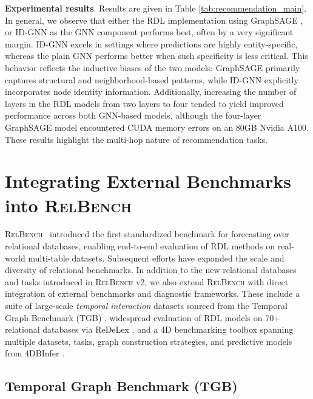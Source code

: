 \documentclass{article} %
\newcommand{\relbench}{\textsc{RelBench}\xspace}
\begin{document}
\textbf{Experimental results}. Results are given in Table \ref{tab:recommendation_main}. In general, we observe that either the RDL implementation using GraphSAGE \citep{hamilton2017inductive}, or ID-GNN \citep{you2021identity} as the GNN component performs best, often by a very significant margin. ID-GNN excels in settings where predictions are highly entity-specific, whereas the plain GNN performs better when such specificity is less critical. This behavior reflects the inductive biases of the two models: GraphSAGE primarily captures structural and neighborhood-based patterns, while ID-GNN explicitly incorporates node identity information. Additionally, increasing the number of layers in the RDL models from two layers to four tended to yield improved performance across both GNN-based models, although the four-layer GraphSAGE model encountered CUDA memory errors on an 80GB Nvidia A100. These results highlight the multi-hop nature of recommendation tasks.


\section{Integrating External Benchmarks into \relbench} \label{sec0:tgb_relbench}

\relbench~\citep{relbench} introduced the first standardized benchmark for forecasting over relational databases, enabling end-to-end evaluation of RDL methods on real-world multi-table datasets. Subsequent efforts have expanded the scale and diversity of relational benchmarks. In addition to the new relational databases and tasks introduced in \relbench v2, we also extend \relbench with direct integration of external benchmarks and diagnostic frameworks. These include a suite of large-scale \emph{temporal interaction} datasets sourced from the Temporal Graph Benchmark (TGB) \citep{rossi2020temporal}, widespread evaluation of RDL models on 70+ relational databases via ReDeLex \citep{peleska2025redelex}, and a 4D benchmarking toolbox spanning multiple datasets, tasks, graph construction strategies, and predictive models from 4DBInfer \citep{wang20244dbinfer}.

\subsection{Temporal Graph Benchmark (TGB)} \label{sec:tgb_datasets}
\end{document}

